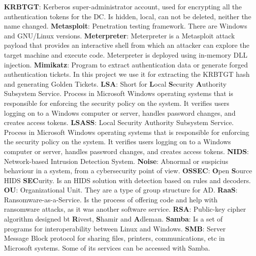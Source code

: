 \linej
\linej
\textbf{KRBTGT}: Kerberos super-administrator account, used for encrypting all the authentication tokens for the DC. Is hidden, local, can not be deleted, neither the name changed.
\linej
\linej
\textbf{Metasploit}: Penetration testing framework. There are Windows and GNU/Linux versions.
\linej
\linej
\textbf{Meterpreter}: Meterpreter is a Metasploit attack payload that provides an interactive shell from which an attacker can explore the target machine and execute code. Meterpreter is deployed using in-memory DLL injection.
\linej
\linej
\textbf{Mimikatz}: Program to extract authentication data or generate forged authentication tickets. In this project we use it for extracting the KRBTGT hash and generating Golden Tickets.
\linej
\linej
\textbf{LSA}: Short for \textbf{L}ocal \textbf{S}ecurity \textbf{A}uthority Subsystem Service. Process in Microsoft Windows operating systems that is responsible for enforcing the security policy on the system. It verifies users logging on to a Windows computer or server, handles password changes, and creates access tokens.
\linej
\linej
\textbf{LSASS}: Local Security Authority Subsystem Service. Process in Microsoft Windows operating systems that is responsible for enforcing the security policy on the system. It verifies users logging on to a Windows computer or server, handles password changes, and creates access tokens.
\linej
\linej
\textbf{NIDS}: Network-based Intrusion Detection System.
\linej
\linej
\textbf{Noise}: Abnormal or suspicius behaviour in a system, from a cybersecurity point of view.
\linej
\linej
\textbf{OSSEC}: \textbf{O}pen \textbf{S}ource HIDS \textbf{SEC}urity. Is an HIDS solution with detection based on rules and decoders.
\linej
\linej
\textbf{OU}: Organizational Unit. They are a type of group structure for AD.
\linej
\linej
\textbf{RaaS}: Ransomware-as-a-Service. Is the process of offering code and help with ransomware attacks, as it was another software service.
\linej
\linej
\textbf{RSA}: Public-key cipher algorithm designed bt \textbf{R}ivest, \textbf{S}hamir and \textbf{A}dleman.
\linej
\linej
\textbf{Samba}: Is a set of programs for interoperability between Linux and Windows.
\linej
\linej
\textbf{SMB}: Server Message Block protocol for sharing files, printers, communications, etc in Microsoft systems. Some of its services can be accessed with Samba.
